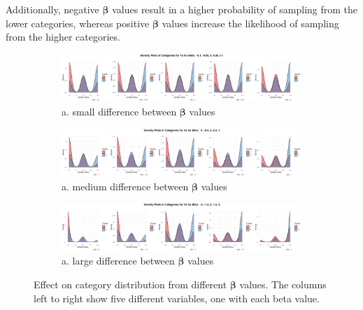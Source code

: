 \documentclass{article}
\begin{document}
Additionally, negative $\bm{\beta}$ values result in a higher probability of sampling from the lower categories, 
whereas positive $\bm{\beta}$ values increase the likelihood of sampling from the higher categories.
\begin{figure}[htbp!]
  \centering
  \begin{subfigure}{1.0\textwidth}
      \centering
      \includegraphics[width=\textwidth]{images/para_sim/beta_1.png}
      \caption*{a. small difference between $\bm{\beta}$ values}
  \end{subfigure}

  \begin{subfigure}{1.0\textwidth}
      \centering
      \includegraphics[width=\textwidth]{images/para_sim/beta_2.png}
      \caption*{a. medium difference between $\bm{\beta}$ values}
    \end{subfigure}

  \begin{subfigure}{1.0\textwidth}
      \centering
      \includegraphics[width=\textwidth]{images/para_sim/beta_3.png}
      \caption*{a. large difference between $\bm{\beta}$ values}
  \end{subfigure}
  
  \caption{Effect on category distribution from different $\bm{\beta}$ values. The columns left to right show five different variables, one with each beta value.}
  \label{fig:beta}
\end{figure}

\clearpage

\end{document}
